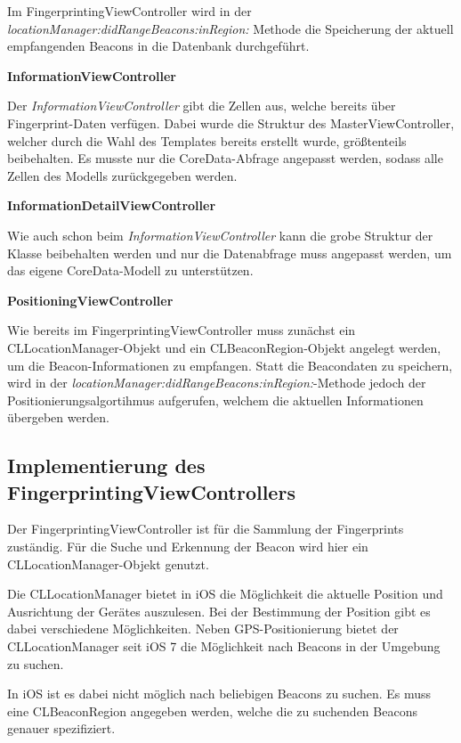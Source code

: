 Im FingerprintingViewController wird in der \emph{locationManager:didRangeBeacons:inRegion:} Methode die Speicherung der aktuell empfangenden Beacons in die Datenbank durchgeführt.


\textbf{InformationViewController}

Der \emph{InformationViewController} gibt die Zellen aus, welche bereits über Fingerprint-Daten verfügen. Dabei wurde die Struktur des MasterViewController, welcher durch die Wahl des Templates bereits erstellt wurde, größtenteils beibehalten. Es musste nur die CoreData-Abfrage angepasst werden, sodass alle Zellen des Modells zurückgegeben werden.


\textbf{InformationDetailViewController}

Wie auch schon beim \emph{InformationViewController} kann die grobe Struktur der Klasse beibehalten werden und nur die Datenabfrage muss angepasst werden, um das eigene CoreData-Modell zu unterstützen.


\textbf{PositioningViewController}

Wie bereits im FingerprintingViewController muss zunächst ein CLLocationManager-Objekt und ein CLBeaconRegion-Objekt angelegt werden, um die Beacon-Informationen zu empfangen.
Statt die Beacondaten zu speichern, wird in der \emph{locationManager:didRangeBeacons:inRegion:}-Methode jedoch der Positionierungsalgortihmus aufgerufen, welchem die aktuellen Informationen übergeben werden.


\subsection{Implementierung des FingerprintingViewControllers}
\label{sec:}

Der FingerprintingViewController ist für die Sammlung der Fingerprints zuständig. 
Für die Suche und Erkennung der Beacon wird hier ein CLLocationManager-Objekt genutzt.

Die CLLocationManager bietet in iOS die Möglichkeit die aktuelle Position und Ausrichtung der Gerätes auszulesen. 
Bei der Bestimmung der Position gibt es dabei verschiedene Möglichkeiten. Neben GPS-Positionierung bietet der CLLocationManager seit iOS 7 die Möglichkeit nach Beacons in der Umgebung zu suchen.

In iOS ist es dabei nicht möglich nach beliebigen Beacons zu suchen. Es muss eine CLBeaconRegion angegeben werden, welche die zu suchenden Beacons genauer spezifiziert. 

